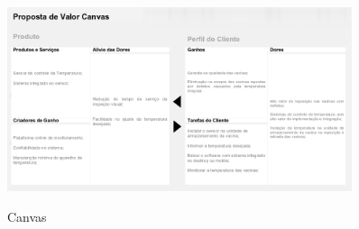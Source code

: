 \documentclass[hidelinks, 12pt, a4paper, brazil, oneside]{abntex2}
\begin{document}
    \begin{figure}
        \caption{Canvas}
        \centering
        \includegraphics[width=0.9\textwidth]{img/canvas.png}
        \label{fig:canvas}
    \end{figure}


\postextual


\end{document}
